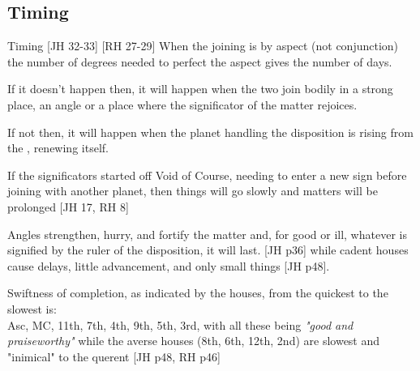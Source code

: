\subsection{Timing}
\begin{frame}[t]{Timing  [JH 32-33] [RH 27-29]}
When the joining is by aspect (not conjunction) the number of degrees needed to perfect the aspect gives the number of days.

If it doesn't happen then, it will happen when the two join bodily in a strong place, an angle or a place where the significator of the matter rejoices.

If not then, it will happen when the planet handling the disposition is rising from the \Sun, renewing itself.

If the significators started off Void of Course, needing to enter a new sign before joining with  another planet, then things will go slowly and matters will be prolonged [JH 17, RH 8]

Angles strengthen, hurry, and fortify the matter and, for good or ill, whatever is signified by the ruler of the disposition, it will last. [JH p36] while cadent houses cause delays, little advancement, and only small things [JH p48].

Swiftness of completion, as indicated by the houses, from the quickest to the slowest is: \\
Asc, MC, 11th, 7th, 4th, 9th, 5th, 3rd,  with all these being \textsl{"good and praiseworthy"} while the averse houses (8th, 6th, 12th, 2nd) are slowest and "inimical" to the querent [JH p48, RH p46]

\end{frame}